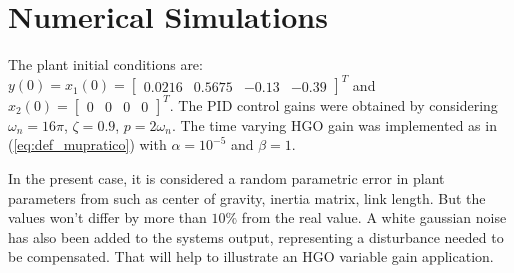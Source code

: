 \documentclass[letterpaper, 10 pt, journal, twocolumn]{IEEEtran}  %
\theoremstyle{plain}
\theoremstyle{definition}
\theoremstyle{remark}
\begin{document}
\section{Numerical Simulations}
\label{sec:Numerical_Simulation}

The plant initial conditions are: $y(0)=x_1(0)=\left[\begin{array}{cccc} 0.0216  & 0.5675 & -0.13 & -0.39\end{array} \right ]^T$ and $x_2(0)=\left[\begin{array}{cccc} 0  & 0 & 0 & 0\end{array} \right ]^T$. The PID control gains were obtained by considering $\omega_n = 16\pi$, $\zeta = 0.9$, $p = 2\omega_n$. The time varying HGO gain was implemented as in (\ref{eq:def_mupratico}) with $\alpha=10^{-5}$ and $\beta=1$.

In the present case, it is considered a random parametric error in plant parameters from \cite{Richter2015} such as center of gravity, inertia matrix, link length. But the values won't differ by more than $10\%$ from the real value. A white gaussian noise has also been added to the systems output, representing a disturbance needed to be compensated. That will help to illustrate an HGO variable gain application.
\end{document}
